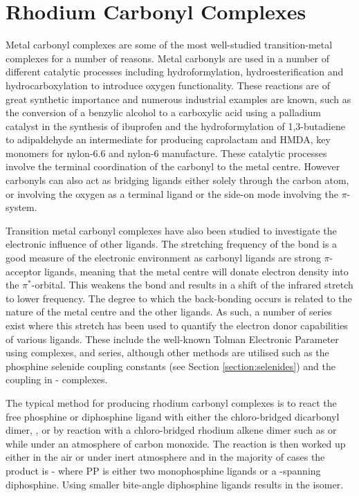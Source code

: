 \section{Rhodium Carbonyl Complexes}

Metal carbonyl complexes are some of the most well-studied transition-metal complexes for a number of reasons.  Metal carbonyls are used in a number of different catalytic processes including hydroformylation, hydroesterification and hydrocarboxylation to introduce oxygen functionality.  These reactions are of great synthetic importance and numerous industrial examples are known, such as the conversion of a benzylic alcohol to a carboxylic acid using a palladium catalyst in the synthesis of ibuprofen\cite{Kjonaas2011} and the hydroformylation of 1,3-butadiene to adipaldehyde an intermediate for producing caprolactam and \gls{HMDA}, key monomers for nylon-6.6 and nylon-6 manufacture.\cite{Franke2012}  These catalytic processes involve the terminal coordination of the carbonyl to the metal centre.  However carbonyls can also act as bridging ligands either solely through the carbon atom, or involving the oxygen as a terminal ligand or the side-on  mode involving the $\pi$-system.  


Transition metal carbonyl complexes have also been studied to investigate the electronic influence of other ligands.  The stretching frequency of the  bond is a good measure of the electronic environment as carbonyl ligands are strong $\pi$-acceptor ligands, meaning that the metal centre will donate electron density into the $\pi^*$-orbital.  This weakens the  bond and results in a shift of the infrared  stretch to lower frequency.  The degree to which the back-bonding occurs is related to the nature of the metal centre and the other ligands.  As such, a number of series exist where this stretch has been used to quantify the electron donor capabilities of various ligands.  These include the well-known Tolman Electronic Parameter using \ce{[Ni(CO)3L]} complexes,\cite{Tolman1977} \ce{[Mo(CO)5L]} and \ce{[Rh(CO)ClL2]} series,\cite{Banger2009}  although other methods are utilised such as the phosphine selenide coupling constants (see Section \ref{section:selenides}) and the \JPtP{} coupling in \cis-\ce{[PtCl2L2]} complexes.\cite{Banger2009}

The typical method for producing rhodium carbonyl complexes is to react the free phosphine or diphosphine ligand with either the chloro-bridged dicarbonyl dimer, , or by reaction with a chloro-bridged rhodium alkene dimer such as  or  while under an atmosphere of carbon monoxide.  The reaction is then worked up either in the air or under inert atmosphere and in the majority of cases the product is \trans-\ce{[Rh(CO)(PP)Cl]} where PP is either two monophosphine ligands or a \trans-spanning diphosphine.  Using smaller bite-angle diphosphine ligands results in the \cis{} isomer.  

